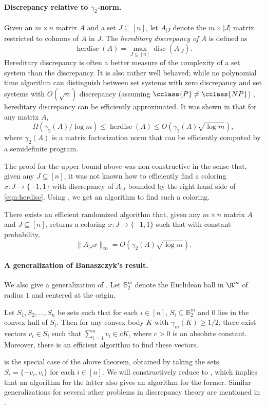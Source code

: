 \documentclass{toc}
\DeclareMathOperator{\disc}{disc}   %
\DeclareMathOperator{\herdisc}{herdisc}   %
\begin{document}
\paragraph{Discrepancy relative to $\gamma_2$-norm.} Given an $m\times n$ matrix $A$ and a set $J\subseteq [n]$, let $A_{|J}$ denote the $m\times |J|$ matrix restricted to columns of $A$ in $J$. The
\textit{hereditary discrepancy of $A$} is defined as
\[ \herdisc(A) = \max_{J\subseteq[n]}\disc(A_{|J}).\]
Hereditary discrepancy is often a better measure of the complexity of a set system than the discrepancy. It is also rather well behaved; while no polynomial time algorithm can distinguish between set systems with zero discrepancy and set systems with $O(\sqrt{n})$ discrepancy (assuming $\cclass{P} \neq \cclass{NP}$) \cite{CNN11}, hereditary discrepancy can be efficiently approximated. It was shown in \cite{MNT14} that for any matrix $A$,
\begin{equation}
\label{eqn:herdisc}
 \Omega(\gamma_2(A)/\log m)\le \herdisc(A) \le O(\gamma_2(A)\sqrt{\log m}),
 \end{equation}
where $\gamma_2(A)$ is a matrix factorization norm that can be efficiently computed by a semidefinite program.

The proof for the upper bound above was non-constructive in the sense that, given any $J\subseteq [n]$, it was not known how to efficiently find a coloring $x:J\rightarrow\{-1,1\}$ with discrepancy of $A_{|J}$ bounded by the right hand side of \eqref{eqn:herdisc}.
Using , we get an algorithm to find such a coloring.
\begin{corollary}
\label{thm:herdisc}
There exists an efficient randomized algorithm that, given any $m\times n$ matrix $A$ and $J\subseteq[n]$, returns a coloring $x:J\rightarrow\{-1,1\}$ such that with constant probability,
\[ \| A_{|J} x\|_{\infty} = O(\gamma_2(A)\sqrt{\log m}).\]
\end{corollary}
\paragraph{A generalization of Banaszczyk's result.} We also give a generalization of . Let
$\mathbb{B}_2^m$ denote the Euclidean ball in $\R^m$ of radius $1$ and centered at the origin.
\begin{theorem}
\label{thm:genbana}
Let $S_1,S_2,\dots,S_n$  be sets such that for each $i\in [n]$, $S_i \subseteq \mathbb{B}_2^m$ and $0$ lies in the convex hull of $S_i$. Then for any convex body $K$ with $\gamma_m(K)\ge 1/2$, there exist vectors $v_i\in S_i$ such that
$\sum_{i=1}^n v_i \in cK$,
where $c>0$ is an absolute constant. Moreover, there is an efficient algorithm to find these vectors.
\end{theorem}
 is the special case of the above theorem, obtained by taking the sets 
%
$S_i=\{-v_i,v_i\}$ for each $i\in [n]$. We will constructively reduce  to , which implies that an algorithm for the latter also gives an algorithm for the former. Similar generalizations for several other problems in discrepancy
theory  %
are mentioned in \cite{B08}.
\end{document}
